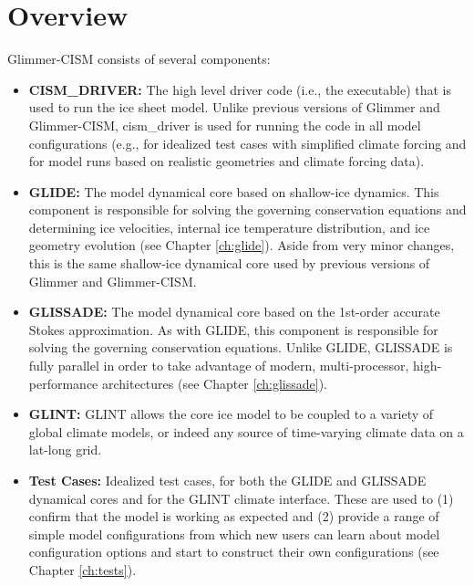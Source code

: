 \section{Overview}
%
Glimmer-CISM consists of several components:
%
\begin{itemize}

\item {\bf CISM\_DRIVER:} The high level driver code (i.e., the executable) that 
is used to run the ice sheet model. Unlike previous versions of Glimmer and Glimmer-CISM, 
cism\_driver is used for running the code in all model configurations 
(e.g., for idealized test cases with simplified climate forcing and for model runs 
based on realistic geometries and climate forcing data).  

\item {\bf GLIDE:} The model dynamical core based on shallow-ice dynamics. 
This component is responsible for solving the governing conservation equations and 
determining ice velocities, internal ice temperature distribution, 
and ice geometry evolution (see Chapter \ref{ch:glide}). 
Aside from very minor changes, this is the same shallow-ice dynamical core 
used by previous versions of Glimmer and Glimmer-CISM.

\item {\bf GLISSADE:} The model dynamical core based on the 1st-order accurate Stokes approximation. As with GLIDE, this component is responsible for solving the governing conservation equations. Unlike GLIDE, GLISSADE is fully parallel in order to take advantage of modern, multi-processor, high-performance architectures (see Chapter \ref{ch:glissade}).

\item {\bf GLINT:} GLINT allows the core ice model to be coupled to a variety of 
global climate models, or indeed any source of time-varying climate data on a lat-long grid. 

\item {\bf Test Cases:} Idealized test cases, for both the GLIDE and GLISSADE dynamical cores 
and for the GLINT climate interface. These are used to (1) confirm that the model 
is working as expected and (2) provide a range of simple model configurations 
from which new users can learn about model configuration options and 
start to construct their own configurations (see Chapter \ref{ch:tests}). 


\end{itemize}
